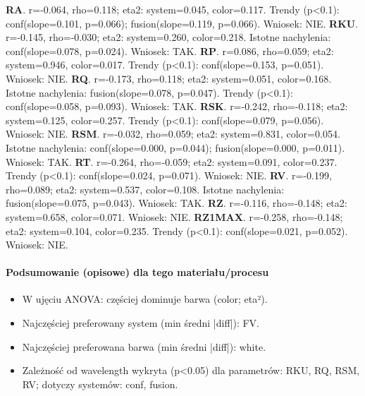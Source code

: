 \documentclass[
  10pt,
]{article}
\begin{document}
\textbf{RA}. r=-0.064, rho=0.118; eta2: system=0.045, color=0.117.
Trendy (p\textless0.1): conf(slope=0.101, p=0.066); fusion(slope=0.119,
p=0.066). Wniosek: NIE. \textbf{RKU}. r=-0.145, rho=-0.030; eta2:
system=0.260, color=0.218. Istotne nachylenia: conf(slope=0.078,
p=0.024). Wniosek: TAK. \textbf{RP}. r=0.086, rho=0.059; eta2:
system=0.946, color=0.017. Trendy (p\textless0.1): conf(slope=0.153,
p=0.051). Wniosek: NIE. \textbf{RQ}. r=-0.173, rho=0.118; eta2:
system=0.051, color=0.168. Istotne nachylenia: fusion(slope=0.078,
p=0.047). Trendy (p\textless0.1): conf(slope=0.058, p=0.093). Wniosek:
TAK. \textbf{RSK}. r=-0.242, rho=-0.118; eta2: system=0.125,
color=0.257. Trendy (p\textless0.1): conf(slope=0.079, p=0.056).
Wniosek: NIE. \textbf{RSM}. r=-0.032, rho=0.059; eta2: system=0.831,
color=0.054. Istotne nachylenia: conf(slope=0.000, p=0.044);
fusion(slope=0.000, p=0.011). Wniosek: TAK. \textbf{RT}. r=-0.264,
rho=-0.059; eta2: system=0.091, color=0.237. Trendy (p\textless0.1):
conf(slope=0.024, p=0.071). Wniosek: NIE. \textbf{RV}. r=-0.199,
rho=0.089; eta2: system=0.537, color=0.108. Istotne nachylenia:
fusion(slope=0.075, p=0.043). Wniosek: TAK. \textbf{RZ}. r=-0.116,
rho=-0.148; eta2: system=0.658, color=0.071. Wniosek: NIE.
\textbf{RZ1MAX}. r=-0.258, rho=-0.148; eta2: system=0.104, color=0.235.
Trendy (p\textless0.1): conf(slope=0.021, p=0.052). Wniosek: NIE.

\paragraph{Podsumowanie (opisowe) dla tego materiału/procesu}
\begin{itemize}
\item W ujęciu ANOVA: częściej dominuje barwa (color; eta²).
\item Najczęściej preferowany system (min średni |diff|): FV.
\item Najczęściej preferowana barwa (min średni |diff|): white.
\item Zależność od wavelength wykryta (p<0.05) dla parametrów: RKU, RQ, RSM, RV; dotyczy systemów: conf, fusion.
\end{itemize}
\end{document}
